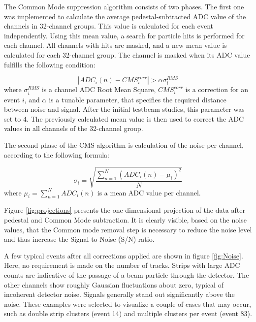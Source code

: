 The Common Mode suppression algorithm consists of two phases. The first one was implemented to calculate the average pedestal-subtracted ADC value of the channels in 32-channel groups. This value is calculated for each event independently. Using this mean value, a search for particle hits is performed for each channel. All channels with hits are masked, and a new mean value is calculated for each 32-channel group. The channel is masked when its ADC value fulfills the following condition:

\begin{equation}
    |ADC_{i}(n)-CMS^{corr}_{i}| > \alpha \sigma^{RMS}_{i}
\end{equation}
where $\sigma^{RMS}_{i}$ is a channel ADC Root Mean Square, $CMS^{corr}_{i} $ is a correction for an event $i$, and $\alpha$ is a tunable parameter, that specifies the required distance between noise and signal. After the initial testbeam studies, this parameter was set to 4. 
The previously calculated mean value is then used to correct the ADC values in all channels of the 32-channel group.

The second phase of the CMS algorithm is calculation of the noise per channel, according to the following formula: 

\begin{equation}
    \sigma_i  = \sqrt{\frac{\sum_{n=1}^{N} (ADC_{i}(n)-\mu_{i})^2}{N}}
\end{equation}
where $\mu_{i} = \sum_{n=1}^{N} ADC_{i}(n)$ is a mean ADC value per channel. 


Figure \ref{fig:projections} presents the one-dimensional projection of the data after pedestal and Common Mode subtraction. It is clearly visible, based on the noise values, that the Common mode removal step is necessary to reduce the noise level and thus increase the Signal-to-Noise (S/N) ratio. 

A few typical events after all corrections applied are shown in figure \ref{fig:Noise}. Here, no requirement is made on the number of tracks. Strips with large ADC counts are indicative of the passage of a beam particle through the detector. The other channels show roughly Gaussian fluctuations about zero, typical of incoherent detector noise. Signals generally
stand out significantly above the noise. These examples were selected to visualize a couple of cases that may occur, such as double strip clusters (event 14) and multiple clusters per event (event 83).  


